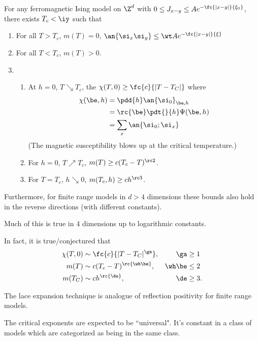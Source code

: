 \begin{thm}
For any ferromagnetic Ising model on $\Z^d$ with $0 \le J_{x-y} \le Ae^{-\fc{|x-y|}{\xi_0}}$, there exists $T_c<\iy$ such that 
\begin{enumerate}
\item
For all $T>T_c$, $m(T)=0$, $\an{\si_x\si_y}\le \wt A e^{-\fc{|x-y|}{\xi}}$
\item
For all $T<T_c$, $m(T)>0$. 
\item
\begin{enumerate}
\item
At $h=0$, $T\searrow T_c$, the  $\chi(T,0)\ge \fc{c}{|T-T_C|}$ where 
\begin{align}
\chi(\be,h) &= \pdd{h} \an{\si_0}_{\be, h} \\
&=\rc{\be}\pdt{}{h}\Psi(\be, h)\\
&=\sum_x \an{\si_0;\si_x}
\end{align}
(The {magnetic susceptibility} blows up at the critical temperature.)
\item
For $h=0$, $T\nearrow T_c$, $m(T) \ge c(T_c-T)^{\rc 2}$.
\item
For $T=T_c$, $h\searrow 0$, $m(T_c,h) \ge ch^{\rc 3}$.
\end{enumerate}
\end{enumerate}
Furthermore, for finite range models in $d>4$ dimensions these bounds also hold in the reverse directions (with different constants).
\end{thm}
Much of this is true in 4 dimensions up to logarithmic constants.

In fact, it is true/conjectured that %
\begin{align}
\chi(T,0) &\sim \fc{c}{|T-T_C|^{\ga}}, &\ga &\ge 1\\
m(T) &\sim c(T_c-T)^{\rc{\wh \be}},&\wh \be &\le 2\\
m(T_C)&\sim ch^{\rc{\de}}, &\de&\ge 3.
\end{align}

The lace expansion technique is analogue of reflection positivity for finite range models.

The critical exponents are expected to be ``universal".
It's constant in a class of models which are categorized as being in the same class.



